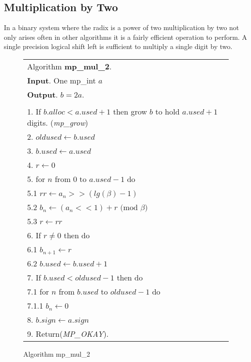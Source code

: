 \documentclass[b5paper]{book}
\begin{document}
\subsection{Multiplication by Two}

In a binary system where the radix is a power of two multiplication by two not only arises often in other algorithms it is a fairly efficient 
operation to perform.  A single precision logical shift left is sufficient to multiply a single digit by two.  

\newpage\begin{figure}[!here]
\begin{small}
\begin{center}
\begin{tabular}{l}
\hline Algorithm \textbf{mp\_mul\_2}. \\
\textbf{Input}.   One mp\_int $a$ \\
\textbf{Output}.  $b = 2a$. \\
\hline \\
1.  If $b.alloc < a.used + 1$ then grow $b$ to hold $a.used + 1$ digits.  (\textit{mp\_grow}) \\
2.  $oldused \leftarrow b.used$ \\
3.  $b.used \leftarrow a.used$ \\
4.  $r \leftarrow 0$ \\
5.  for $n$ from 0 to $a.used - 1$ do \\
\hspace{3mm}5.1  $rr \leftarrow a_n >> (lg(\beta) - 1)$ \\
\hspace{3mm}5.2  $b_n \leftarrow (a_n << 1) + r \mbox{ (mod }\beta\mbox{)}$ \\
\hspace{3mm}5.3  $r \leftarrow rr$ \\
6.  If $r \ne 0$ then do \\
\hspace{3mm}6.1  $b_{n + 1} \leftarrow r$ \\
\hspace{3mm}6.2  $b.used \leftarrow b.used + 1$ \\
7.  If $b.used < oldused - 1$ then do \\
\hspace{3mm}7.1  for $n$ from $b.used$ to $oldused - 1$ do \\
\hspace{6mm}7.1.1  $b_n \leftarrow 0$ \\
8.  $b.sign \leftarrow a.sign$ \\
9.  Return(\textit{MP\_OKAY}).\\
\hline
\end{tabular}
\end{center}
\end{small}
\caption{Algorithm mp\_mul\_2}
\end{figure}
\end{document}
